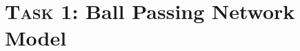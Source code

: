 \documentclass[12pt]{article}  %
\begin{document}
    
    
    
    
 



\section{\textsc{Task 1: }Ball Passing Network Model}
\end{document}
